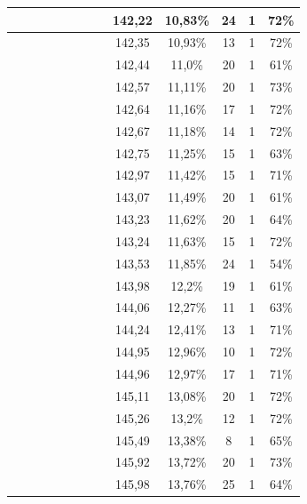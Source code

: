 \begin{center}
\begin{longtable}{|c|c|c|c|c|c|c|c|c|c|c|c|c|}
 \x &  &  &  &  \x &  \x &  &  & 142,22 & 10,83\% & 24 & 1 & 72\% \\ \hline
 \x &  \x &  \x &  \x &  &  \x &  \x &  \x & 142,35 & 10,93\% & 13 & 1 & 72\% \\ \hline
 \x &  \x &  &  \x &  \x &  &  &  \x & 142,44 & 11,0\% & 20 & 1 & 61\% \\ \hline
 \x &  \x &  \x &  &  &  \x &  \x &  \x & 142,57 & 11,11\% & 20 & 1 & 73\% \\ \hline
 \x &  \x &  &  \x &  &  \x &  &  \x & 142,64 & 11,16\% & 17 & 1 & 72\% \\ \hline
 \x &  &  \x &  &  &  \x &  &  \x & 142,67 & 11,18\% & 14 & 1 & 72\% \\ \hline
 \x &  \x &  \x &  &  \x &  &  &  & 142,75 & 11,25\% & 15 & 1 & 63\% \\ \hline
 \x &  &  \x &  \x &  \x &  \x &  &  \x & 142,97 & 11,42\% & 15 & 1 & 71\% \\ \hline
 \x &  \x &  &  &  \x &  &  &  \x & 143,07 & 11,49\% & 20 & 1 & 61\% \\ \hline
 \x &  \x &  \x &  &  &  &  \x &  \x & 143,23 & 11,62\% & 20 & 1 & 64\% \\ \hline
 \x &  &  \x &  \x &  &  \x &  &  \x & 143,24 & 11,63\% & 15 & 1 & 72\% \\ \hline
 \x &  \x &  &  \x &  &  &  &  \x & 143,53 & 11,85\% & 24 & 1 & 54\% \\ \hline
 \x &  \x &  &  &  \x &  &  &  & 143,98 & 12,2\% & 19 & 1 & 61\% \\ \hline
 \x &  \x &  \x &  &  \x &  &  &  \x & 144,06 & 12,27\% & 11 & 1 & 63\% \\ \hline
 \x &  \x &  \x &  &  &  \x &  \x &  & 144,24 & 12,41\% & 13 & 1 & 71\% \\ \hline
 \x &  &  &  \x &  \x &  \x &  &  & 144,95 & 12,96\% & 10 & 1 & 72\% \\ \hline
 \x &  \x &  \x &  &  \x &  \x &  &  & 144,96 & 12,97\% & 17 & 1 & 71\% \\ \hline
 \x &  &  &  &  &  \x &  &  \x & 145,11 & 13,08\% & 20 & 1 & 72\% \\ \hline
 \x &  \x &  &  \x &  \x &  \x &  &  & 145,26 & 13,2\% & 12 & 1 & 72\% \\ \hline
 \x &  \x &  \x &  \x &  &  &  &  \x & 145,49 & 13,38\% & 8 & 1 & 65\% \\ \hline
 \x &  &  \x &  &  \x &  \x &  \x &  & 145,92 & 13,72\% & 20 & 1 & 73\% \\ \hline
 \x &  &  \x &  &  \x &  &  \x &  \x & 145,98 & 13,76\% & 25 & 1 & 64\% \\ \hline

\end{longtable}
\end{center}
